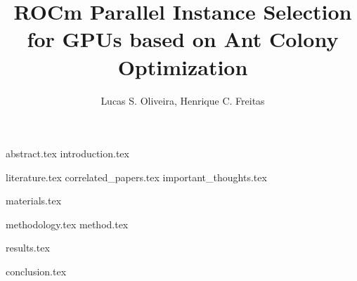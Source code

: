 \documentclass{article}
\title{ROCm Parallel Instance Selection for GPUs based on Ant Colony Optimization}
\author{{Lucas S. Oliveira\inst{1}, Henrique C. Freitas\inst{1}}}
\begin{document}
\maketitle

{abstract.tex}
{introduction.tex}

{literature.tex}
{correlated_papers.tex}
{important_thoughts.tex}

{materials.tex}

{methodology.tex}
{method.tex}

{results.tex}

{conclusion.tex}

\printbibliography
\end{document}
